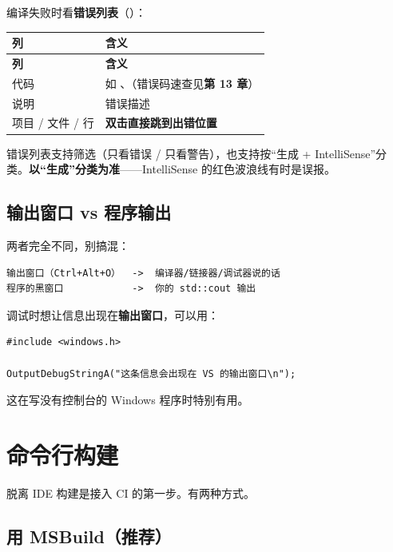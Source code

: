 编译失败时看\textbf{错误列表}（）：

\begin{longtable}{L{3.0cm}L{12.0cm}}\toprule
\textbf{列} & \textbf{含义} \\ \midrule \endfirsthead
\toprule \textbf{列} & \textbf{含义} \\ \midrule \endhead
\bottomrule \endlastfoot
代码 & 如 、（错误码速查见\textbf{第 13 章}） \\
说明 & 错误描述 \\
项目 / 文件 / 行 & \textbf{双击直接跳到出错位置} \\
\end{longtable}

\begin{tipbox}[提示]
错误列表支持筛选（只看错误 / 只看警告），也支持按“生成 + IntelliSense”分类。\textbf{以“生成”分类为准}——IntelliSense 的红色波浪线有时是误报。
\end{tipbox}

\subsection{输出窗口 vs 程序输出}

两者完全不同，别搞混：

\begin{lstlisting}[style=textstyle]
输出窗口（Ctrl+Alt+O）  ->  编译器/链接器/调试器说的话
程序的黑窗口            ->  你的 std::cout 输出
\end{lstlisting}

调试时想让信息出现在\textbf{输出窗口}，可以用：

\begin{lstlisting}[style=cppstyle]
#include <windows.h>

OutputDebugStringA("这条信息会出现在 VS 的输出窗口\n");
\end{lstlisting}

这在写没有控制台的 Windows 程序时特别有用。

\section{命令行构建}

脱离 IDE 构建是接入 CI 的第一步。有两种方式。

\subsection{用 MSBuild（推荐）}

